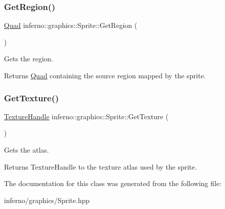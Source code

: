 \subsubsection{\texorpdfstring{Get\+Region()}{GetRegion()}}
{\footnotesize\ttfamily \mbox{\hyperlink{classinferno_1_1graphics_1_1_quad}{Quad}} inferno\+::graphics\+::\+Sprite\+::\+Get\+Region (\begin{DoxyParamCaption}{ }\end{DoxyParamCaption})\hspace{0.3cm}{\ttfamily [inline]}}



Gets the region. 

\begin{DoxyReturn}{Returns}
\mbox{\hyperlink{classinferno_1_1graphics_1_1_quad}{Quad}} containing the source region mapped by the sprite. 
\end{DoxyReturn}
\mbox{\label{classinferno_1_1graphics_1_1_sprite_a289d0e72752f3606116c75442a710e61}} 
\subsubsection{\texorpdfstring{Get\+Texture()}{GetTexture()}}
{\footnotesize\ttfamily \mbox{\hyperlink{namespaceinferno_1_1graphics_a9d719bfbfedd17b9ace9b8d603ab5a38}{Texture\+Handle}} inferno\+::graphics\+::\+Sprite\+::\+Get\+Texture (\begin{DoxyParamCaption}{ }\end{DoxyParamCaption})\hspace{0.3cm}{\ttfamily [inline]}}



Gets the atlas. 

\begin{DoxyReturn}{Returns}
Texture\+Handle to the texture atlas used by the sprite. 
\end{DoxyReturn}


The documentation for this class was generated from the following file\+:\begin{DoxyCompactItemize}
\item 
inferno/graphics/Sprite.\+hpp\end{DoxyCompactItemize}

